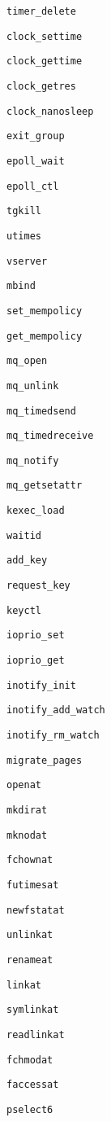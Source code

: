 \verb+timer_delete+

\verb+clock_settime+

\verb+clock_gettime+

\verb+clock_getres+

\verb+clock_nanosleep+

\verb+exit_group+

\verb+epoll_wait+

\verb+epoll_ctl+

\verb+tgkill+

\verb+utimes+

\verb+vserver+

\verb+mbind+

\verb+set_mempolicy+

\verb+get_mempolicy+

\verb+mq_open+

\verb+mq_unlink+

\verb+mq_timedsend+

\verb+mq_timedreceive+

\verb+mq_notify+

\verb+mq_getsetattr+

\verb+kexec_load+

\verb+waitid+

\verb+add_key+

\verb+request_key+

\verb+keyctl+

\verb+ioprio_set+

\verb+ioprio_get+

\verb+inotify_init+

\verb+inotify_add_watch+

\verb+inotify_rm_watch+

\verb+migrate_pages+

\verb+openat+

\verb+mkdirat+

\verb+mknodat+

\verb+fchownat+

\verb+futimesat+

\verb+newfstatat+

\verb+unlinkat+

\verb+renameat+

\verb+linkat+

\verb+symlinkat+

\verb+readlinkat+

\verb+fchmodat+

\verb+faccessat+

\verb+pselect6+

